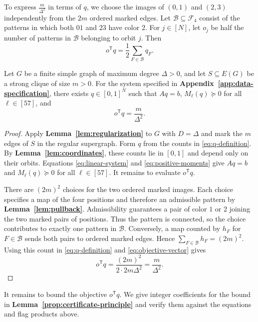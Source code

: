To express $\frac{m}{\Delta^2}$ in terms of $q$, we choose the
images of $(0,1)$ and $(2,3)$ independently from the $2m$ ordered
marked edges. Let $\mathcal B\subseteq\mathcal F_4$ consist of the
patterns in which both $01$ and $23$ have color $2$. For $j\in[N]$,
let $o_j$ be half the number of patterns in $\mathcal B$ belonging
to orbit $j$. Then
\begin{equation}\label{eq:objective-vector}
 o^{\mathsf T}q=\frac{1}{2}\sum_{F\in\mathcal B}q_F.
\end{equation}

\begin{lemma}\label{lem:finite-encoding}\label{lem:objective}
Let $G$ be a finite simple graph of maximum degree $\Delta>0$, and
let $S\subseteq E(G)$ be a strong clique of size $m>0$. For the system
specified in \textbf{Appendix~\ref{app:data-specification}}, there exists
$q\in[0,1]^N$ such that $Aq=b$, $M_\ell(q)\succeq0$ for all
$\ell\in[57]$, and
\begin{equation}\label{eq:objective-value}
 o^{\mathsf T}q=\frac{m}{\Delta^2}.
\end{equation}
\end{lemma}

\begin{proof}
Apply \textbf{Lemma~\ref{lem:regularization}} to $G$ with $D=\Delta$
and mark the $m$ edges of $S$ in the regular supergraph. Form $q$
from the counts in \eqref{eq:q-definition}. By
\textbf{Lemma~\ref{lem:coordinates}}, these counts lie in $[0,1]$
and depend only on their orbits. Equations \eqref{eq:linear-system}
and \eqref{eq:positive-moments} give $Aq=b$ and $M_\ell(q)\succeq0$
for all $\ell\in[57]$. It remains to evaluate $o^{\mathsf T}q$.

There are $(2m)^2$ choices for the two ordered marked images.
Each choice specifies a map of the four positions and therefore
an admissible pattern by \textbf{Lemma~\ref{lem:pullback}}.
Admissibility guarantees a pair of color $1$ or $2$ joining the
two marked pairs of positions. Thus the pattern is connected,
so the choice contributes to exactly one pattern in $\mathcal B$.
Conversely, a map counted by $h_F$ for $F\in\mathcal B$ sends both
pairs to ordered marked edges. Hence $\sum_{F\in\mathcal B}h_F=(2m)^2$.
Using this count in \eqref{eq:q-definition} and
\eqref{eq:objective-vector} gives
\[
 o^{\mathsf T}q
 =\frac{(2m)^2}{2\cdot2m\Delta^2}
 =\frac{m}{\Delta^2}.
\]
\end{proof}

It remains to bound the objective $o^{\mathsf T}q$. We give integer
coefficients for the bound in \textbf{Lemma~\ref{prop:certificate-principle}}
and verify them against the equations and flag products above.

